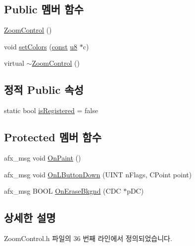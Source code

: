 \subsection*{Public 멤버 함수}
\begin{DoxyCompactItemize}
\item 
\mbox{\hyperlink{class_zoom_control_a25717ea859dbfc8cea82698d01c1db32}{Zoom\+Control}} ()
\item 
void \mbox{\hyperlink{class_zoom_control_a97501cc16d3068eefa1b5d9d23e9d0d9}{set\+Colors}} (\mbox{\hyperlink{getopt1_8c_a2c212835823e3c54a8ab6d95c652660e}{const}} \mbox{\hyperlink{_system_8h_aed742c436da53c1080638ce6ef7d13de}{u8}} $\ast$c)
\item 
virtual \mbox{\hyperlink{class_zoom_control_aa31326d68ae9e4afbbf8e1375fb06f75}{$\sim$\+Zoom\+Control}} ()
\end{DoxyCompactItemize}
\subsection*{정적 Public 속성}
\begin{DoxyCompactItemize}
\item 
static bool \mbox{\hyperlink{class_zoom_control_a545871645485be870723f47d8ef439ff}{is\+Registered}} = false
\end{DoxyCompactItemize}
\subsection*{Protected 멤버 함수}
\begin{DoxyCompactItemize}
\item 
afx\+\_\+msg void \mbox{\hyperlink{class_zoom_control_a76dc63877ee99097aa9b0aa86a408419}{On\+Paint}} ()
\item 
afx\+\_\+msg void \mbox{\hyperlink{class_zoom_control_a350939fc193e3fd5dbc1f3e6cb18b4c0}{On\+L\+Button\+Down}} (U\+I\+NT n\+Flags, C\+Point point)
\item 
afx\+\_\+msg B\+O\+OL \mbox{\hyperlink{class_zoom_control_a9efd77599efc02d9059a797b59a7911f}{On\+Erase\+Bkgnd}} (C\+DC $\ast$p\+DC)
\end{DoxyCompactItemize}


\subsection{상세한 설명}


Zoom\+Control.\+h 파일의 36 번째 라인에서 정의되었습니다.



